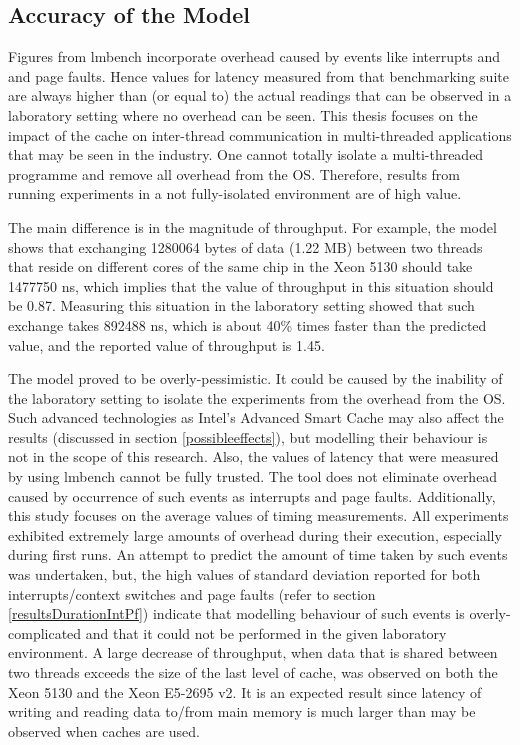 \subsection{Accuracy of the Model}

Figures from lmbench incorporate overhead caused by events like interrupts and and page faults. Hence values for latency measured from that benchmarking suite are always higher than (or equal to) the actual readings that can be observed in a laboratory setting where no overhead can be seen. This thesis focuses on the impact of the cache on inter-thread communication in multi-threaded applications that may be seen in the industry. One cannot totally isolate a multi-threaded programme and remove all overhead from the OS. Therefore, results from running experiments in a not fully-isolated environment are of high value. 

The main difference is in the magnitude of throughput. For example, the model shows that exchanging 1280064 bytes of data (1.22 MB) between two threads that reside on different cores of the same chip in the Xeon 5130 should take 1477750 ns, which implies that the value of throughput in this situation should be 0.87. Measuring this situation in the laboratory setting showed that such exchange takes 892488 ns, which is about 40\% times faster than the predicted value, and the reported value of throughput is 1.45.

The model proved to be overly-pessimistic. It could be caused by the inability of the laboratory setting to isolate the experiments from the overhead from the OS. Such advanced technologies as Intel's Advanced Smart Cache may also affect the results (discussed in section \ref{possibleeffects}), but modelling their behaviour is not in the scope of this research. Also, the values of latency that were measured by using lmbench cannot be fully trusted. The tool does not eliminate overhead caused by occurrence of such events as interrupts and page faults. Additionally, this study focuses on the average values of timing measurements. All experiments exhibited extremely large amounts of overhead during their execution, especially during first runs. An attempt to predict the amount of time taken by such events was undertaken, but, the high values of standard deviation reported for both interrupts/context switches and page faults (refer to section \ref{resultsDurationIntPf}) indicate that modelling behaviour of such events is overly-complicated and that it could not be performed in the given laboratory environment. A large decrease of throughput, when data that is shared between two threads exceeds the size of the last level of cache, was observed on both the Xeon 5130 and the Xeon E5-2695 v2. It is an expected result since latency of writing and reading data to/from main memory is much larger than may be observed when caches are used.

